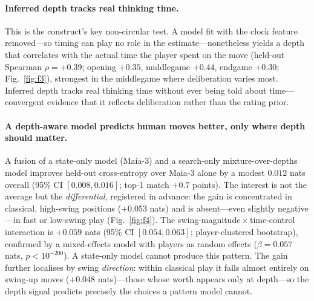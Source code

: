 \documentclass[11pt]{article}
\begin{document}
\paragraph{Inferred depth tracks real thinking time.} This is the construct's key
non-circular test. A model fit with the clock feature removed---so timing can play no role in
the estimate---nonetheless yields a depth that correlates with the actual time the player
spent on the move (held-out Spearman $\rho=+0.39$; opening $+0.35$, middlegame $+0.44$,
endgame $+0.30$; Fig.~\ref{fig:f3}), strongest in the middlegame where deliberation varies
most. Inferred depth tracks real thinking time without ever being told about time---convergent
evidence that it reflects deliberation rather than the rating prior.

\paragraph{A depth-aware model predicts human moves better, only where depth should matter.}
A fusion of a state-only model (Maia-3) and a search-only mixture-over-depths model improves
held-out cross-entropy over Maia-3 alone by a modest $0.012$ nats overall (95\% CI
$[0.008,0.016]$; top-1 match $+0.7$ points). The interest is not the average but the
\emph{differential}, registered in advance: the gain is concentrated in classical, high-swing
positions ($+0.053$ nats) and is absent---even slightly negative---in fast or low-swing play
(Fig.~\ref{fig:f4}). The swing-magnitude\,$\times$\,time-control interaction is
$+0.059$ nats (95\% CI $[0.054,0.063]$; player-clustered bootstrap), confirmed by a
mixed-effects model with players as random effects ($\beta=0.057$ nats,
$p<10^{-200}$). A state-only model cannot produce this pattern. The gain further localises by swing \emph{direction}: within
classical play it falls almost entirely on swing-up moves ($+0.048$ nats)---those whose worth
appears only at depth---so the depth signal predicts precisely the choices a pattern model
cannot.
\end{document}
